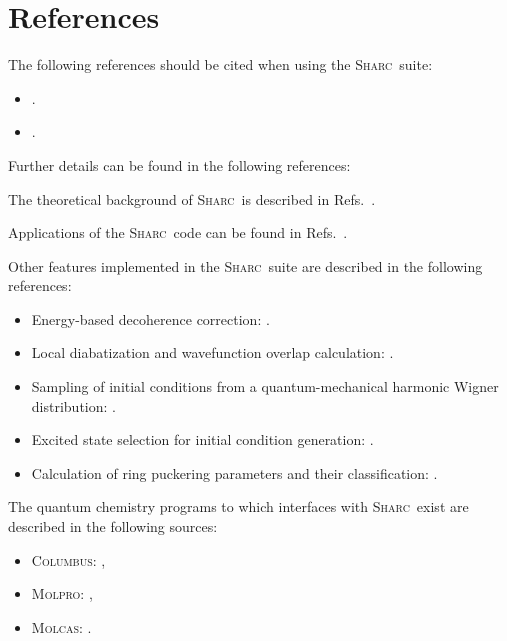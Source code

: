 \documentclass[a4paper,11pt,DIV=15,openany,twoside=false]{scrbook}
\newcommand{\sharc}{\textsc{Sharc}}
\begin{document}
\section{References}

The following references should be cited when using the \sharc\ suite:
{
\newcommand{\enquote}[1]{``#1''}
\begin{shaded}
  \begin{itemize}
    \item \cite{Richter2011JCTC} .
    \item \cite{Mai2014SHARC} .
  \end{itemize}
\end{shaded}
}

Further details can be found in the following references:

The theoretical background of \sharc\ is described in Refs.~\cite{Richter2011JCTC, Richter2012JCTC_erratum, Bajo2011JPCA, Marquetand2011FD}.

Applications of the \sharc\ code can be found in Refs.~\cite{Richter2012JPCL, Mai2013C, Mai2014TCC, Mai2014JCP_SO2, Gonzalez2014}.

Other features implemented in the \sharc\ suite are described in the following references:
\begin{itemize}
  \item Energy-based decoherence correction: \cite{Granucci2007JCP}.
  \item Local diabatization and wavefunction overlap calculation: \cite{Granucci2001JCP, Pittner2009CP, Plasser2012JCP}.
  \item Sampling of initial conditions from a quantum-mechanical harmonic Wigner distribution: \cite{Dahl1988JCP, Schinke1995}.
  \item Excited state selection for initial condition generation: \cite{Barbatti2011}.
  \item Calculation of ring puckering parameters and their classification: \cite{Cremer1975JACS, Boeyens1976JCMS}.
\end{itemize}

The quantum chemistry programs to which interfaces with \sharc\ exist are described in the following sources:
\begin{itemize}
  \item \textsc{Columbus}: \cite{Lischka2011WCMS, Lischka2012, Yabushita1999JPCA, Mai2014JCP_reindex},
  \item \textsc{Molpro}: \cite{Werner2012WCMS, Werner2012},
  \item \textsc{Molcas}: \cite{Karlstrom2003CMS, Aquilante2010JCC}.
\end{itemize}
\end{document}

